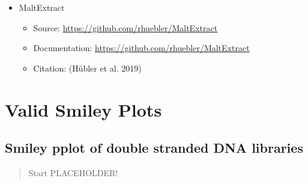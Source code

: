\documentclass[
  letterpaper,
  DIV=11,
  numbers=noendperiod]{scrreprt}
\providecommand{\tightlist}{%
  \setlength{\itemsep}{0pt}\setlength{\parskip}{0pt}}\usepackage{longtable,booktabs,array}
\begin{document}
\begin{itemize}
\tightlist
\item
  MaltExtract

  \begin{itemize}
  \tightlist
  \item
    Source: \url{https://github.com/rhuebler/MaltExtract}
  \item
    Documentation: \url{https://github.com/rhuebler/MaltExtract}
  \item
    Citation: (Hübler et al. 2019)
  \end{itemize}
\end{itemize}

\part{Valid Smiley Plots}

\hypertarget{smiley-pplot-of-double-stranded-dna-libraries}{%
\chapter{Smiley pplot of double stranded DNA
libraries}\label{smiley-pplot-of-double-stranded-dna-libraries}}

\begin{quote}
Start PLACEHOLDER!
\end{quote}
\end{document}
